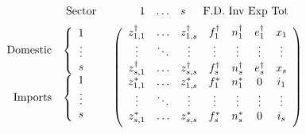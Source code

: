 \documentclass[a4paper]{article}
\begin{document}
\begin{equation}\label{eqn:T}
\begin{array}{rc}
\begin{array}{cc} & \mbox{Sector} \end{array} 
& 
\begin{array}{cccc} \hspace*{4mm}1 & \mathellipsis & s & \hspace*{2mm} \mbox{F.D. Inv Exp Tot} \end{array} \vspace*{2mm} \\
\begin{array}{r}
\begin{array}{rc}
\mbox{Domestic} & \left\{ \begin{array}{c}
1 \\
\vdots \\
s
\end{array} \right. \\
\mbox{Imports} & \left\{ \begin{array}{c}
1 \\
\vdots \\
s \\
\end{array} \right.
\end{array} \vspace*{2mm} \\
\end{array} &
\left( \begin{array}{ccccccc}
z^{\dag}_{1,1} & \mathellipsis & z^{\dag}_{1,s} & f^\dag_{1} & n^\dag_{1} & e^\dag_{1} & x_1 \\
\vdots & \ddots & \vdots & \vdots & \vdots & \vdots & \vdots \\
z^{\dag}_{s,1} & \mathellipsis & z^{\dag}_{s,s} & f^\dag_{s} & n^\dag_{s} & e^\dag_{s} & x_{s} \\
z^*_{1,1} & \mathellipsis & z^*_{1,s} & f^*_{1} & n^*_{1} & 0 & i_1 \\
\vdots & \ddots & \vdots & \vdots & \vdots & \vdots & \vdots \\
z^*_{s,1} & \mathellipsis & z^*_{s,s} & f^*_{s} & n^*_{s} & 0 & i_{s} \vspace*{2mm} \\
\end{array} \right)
\end{array}
\end{equation}
\end{document}
